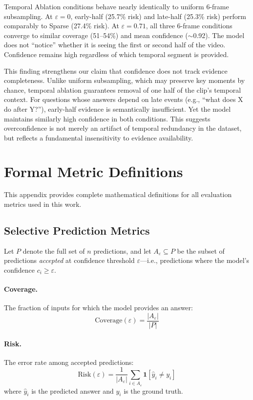 \documentclass{article}
\begin{document}
Temporal Ablation conditions behave nearly identically to uniform 6-frame subsampling. At $\varepsilon=0$, early-half (25.7\% risk) and late-half (25.3\% risk) perform comparably to Sparse (27.4\% risk). At $\varepsilon=0.71$, all three 6-frame conditions converge to similar coverage (51--54\%) and mean confidence ($\sim$0.92). The model does not ``notice'' whether it is seeing the first or second half of the video. Confidence remains high regardless of which temporal segment is provided.

This finding strengthens our claim that confidence does not track evidence completeness. Unlike uniform subsampling, which may preserve key moments by chance, temporal ablation guarantees removal of one half of the clip's temporal context. For questions whose answers depend on late events (e.g., ``what does X do after Y?''), early-half evidence is semantically insufficient. Yet the model maintains similarly high confidence in both conditions. This suggests overconfidence is not merely an artifact of temporal redundancy in the dataset, but reflects a fundamental insensitivity to evidence availability.

\section{Formal Metric Definitions}
\label{app:metrics}

This appendix provides complete mathematical definitions for all evaluation metrics used in this work.

\subsection{Selective Prediction Metrics}

Let $P$ denote the full set of $n$ predictions, and let $A_\varepsilon \subseteq P$ be the subset of predictions \emph{accepted} at confidence threshold $\varepsilon$---i.e., predictions where the model's confidence $c_i \geq \varepsilon$.

\paragraph{Coverage.} The fraction of inputs for which the model provides an answer:
\begin{equation}
\text{Coverage}(\varepsilon) = \frac{|A_\varepsilon|}{|P|}
\end{equation}

\paragraph{Risk.} The error rate among accepted predictions:
\begin{equation}
\text{Risk}(\varepsilon) = \frac{1}{|A_\varepsilon|} \sum_{i \in A_\varepsilon} \mathbf{1}[\hat{y}_i \neq y_i]
\end{equation}
where $\hat{y}_i$ is the predicted answer and $y_i$ is the ground truth.
\end{document}
